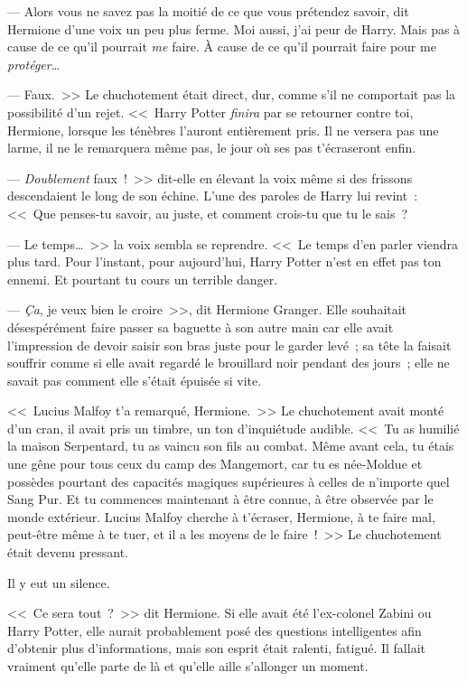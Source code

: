 --- Alors vous ne savez pas la moitié de ce que vous prétendez savoir, dit Hermione d'une voix un peu plus ferme. Moi aussi, j'ai peur de Harry. Mais pas à cause de ce qu'il pourrait \emph{me} faire. À cause de ce qu'il pourrait faire pour me \emph{protéger}…

--- Faux.~>> Le chuchotement était direct, dur, comme s'il ne comportait pas la possibilité d'un rejet. <<~Harry Potter \emph{finira} par se retourner contre toi, Hermione, lorsque les ténèbres l'auront entièrement pris. Il ne versera pas une larme, il ne le remarquera même pas, le jour où ses pas t'écraseront enfin.

--- \emph{Doublement} faux~!~>> dit-elle en élevant la voix même si des frissons descendaient le long de son échine. L'une des paroles de Harry lui revint~: <<~Que penses-tu savoir, au juste, et comment crois-tu que tu le sais~?

--- Le temps…~>> la voix sembla se reprendre. <<~Le temps d'en parler viendra plus tard. Pour l'instant, pour aujourd'hui, Harry Potter n'est en effet pas ton ennemi. Et pourtant tu cours un terrible danger.

--- \emph{Ça}, je veux bien le croire~>>, dit Hermione Granger. Elle souhaitait désespérément faire passer sa baguette à son autre main car elle avait l'impression de devoir saisir son bras juste pour le garder levé~; sa tête la faisait souffrir comme si elle avait regardé le brouillard noir pendant des jours~; elle ne savait pas comment elle s'était épuisée si vite.

<<~Lucius Malfoy t'a remarqué, Hermione.~>> Le chuchotement avait monté d'un cran, il avait pris un timbre, un ton d'inquiétude audible. <<~Tu as humilié la maison Serpentard, tu as vaincu son fils au combat. Même avant cela, tu étais une gêne pour tous ceux du camp des Mangemort, car tu es née-Moldue et possèdes pourtant des capacités magiques supérieures à celles de n'importe quel Sang Pur. Et tu commences maintenant à être connue, à être observée par le monde extérieur. Lucius Malfoy cherche à t'écraser, Hermione, à te faire mal, peut-être même à te tuer, et il a les moyens de le faire~!~>> Le chuchotement était devenu pressant.

Il y eut un silence.

<<~Ce sera tout~?~>> dit Hermione. Si elle avait été l'ex-colonel Zabini ou Harry Potter, elle aurait probablement posé des questions intelligentes afin d'obtenir plus d'informations, mais son esprit était ralenti, fatigué. Il fallait vraiment qu'elle parte de là et qu'elle aille s'allonger un moment.


